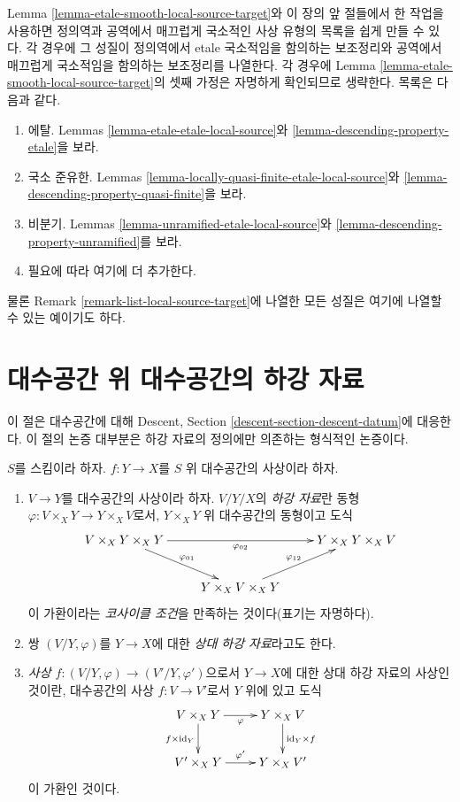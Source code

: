 \begin{remark}
\label{remark-list-etale-smooth-local-source-target}
Lemma \ref{lemma-etale-smooth-local-source-target}와 이 장의 앞 절들에서 한
작업을 사용하면
정의역과 공역에서 매끄럽게 국소적인 사상 유형의 목록을 쉽게 만들 수
있다. 각 경우에 그 성질이 정의역에서 etale 국소적임을 함의하는
보조정리와 공역에서 매끄럽게 국소적임을 함의하는 보조정리를 나열한다.
각 경우에 Lemma \ref{lemma-etale-smooth-local-source-target}의 셋째 가정은
자명하게 확인되므로 생략한다. 목록은 다음과 같다.
\begin{enumerate}
\item 에탈. Lemmas \ref{lemma-etale-etale-local-source}와
\ref{lemma-descending-property-etale}을 보라.
\item 국소 준유한. Lemmas \ref{lemma-locally-quasi-finite-etale-local-source}와
\ref{lemma-descending-property-quasi-finite}을 보라.
\item 비분기. Lemmas \ref{lemma-unramified-etale-local-source}와
\ref{lemma-descending-property-unramified}를 보라.
\item 필요에 따라 여기에 더 추가한다.
\end{enumerate}
물론 Remark \ref{remark-list-local-source-target}에 나열한 모든 성질은
여기에 나열할 수 있는 예이기도 하다.
\end{remark}

\section{대수공간 위 대수공간의 하강 자료}
\label{section-descent-datum}

\noindent
이 절은 대수공간에 대해 Descent, Section
\ref{descent-section-descent-datum}에 대응한다. 이 절의 논증 대부분은
하강 자료의 정의에만 의존하는 형식적인 논증이다.

\begin{definition}
\label{definition-descent-datum}
$S$를 스킴이라 하자. $f:Y\to X$를 $S$ 위 대수공간의 사상이라 하자.
\begin{enumerate}
\item $V\to Y$를 대수공간의 사상이라 하자. $V/Y/X$의
{\it 하강 자료}란 동형 $\varphi:V\times_XY\to Y\times_XV$로서,
$Y\times_XY$ 위 대수공간의 동형이고 도식
$$
\xymatrix{
V \times_X Y \times_X Y \ar[rd]^{\varphi_{01}} \ar[rr]_{\varphi_{02}} &
&
Y \times_X Y \times_X V\\
&
Y \times_X V \times_X Y \ar[ru]^{\varphi_{12}}
}
$$
이 가환이라는 {\it 코사이클 조건}을 만족하는 것이다(표기는 자명하다).
\item 쌍 $(V/Y,\varphi)$를 $Y\to X$에 대한 {\it 상대 하강 자료}라고도 한다.
\item {\it 사상 $f:(V/Y,\varphi)\to(V'/Y,\varphi')$}으로서 $Y\to X$에
대한 상대 하강 자료의 사상인 것이란, 대수공간의 사상 $f:V\to V'$로서
$Y$ 위에 있고 도식
$$
\xymatrix{
V \times_X Y \ar[r]_{\varphi} \ar[d]_{f \times \text{id}_Y} &
Y \times_X V \ar[d]^{\text{id}_Y \times f} \\
V' \times_X Y \ar[r]^{\varphi'} & Y \times_X V'
}
$$
이 가환인 것이다.
\end{enumerate}
\end{definition}

